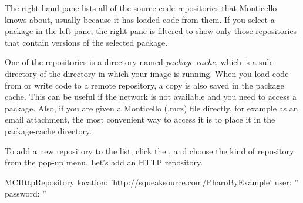 \documentclass[a4paper,10pt,twoside]{book}
\begin{document}
The right-hand pane lists all of the source-code repositories that Monticello knows about, usually because it has loaded code from them.  If you select a package in the left pane, the right pane is filtered to show only those repositories that contain versions of the selected package.

One of the repositories is a directory named \emph{package-cache}, which is a sub-directory of the directory in which your image is running.  
When you load code from or write code to a remote repository, a copy is also saved in the package cache.  This can be useful if the network is not available and you need to access a package.  Also, if you are given a Monticello (.mcz) file directly, for example as an email attachment, the most convenient way to access it is to place it in the package-cache directory.

To add a new repository to the list, click the , and choose the kind of repository from the pop-up menu.  Let's add an HTTP repository.

\begin{code}{}
MCHttpRepository
	location: 'http://squeaksource.com/PharoByExample'
	user: ''
	password: ''
\end{code}
\end{document}
